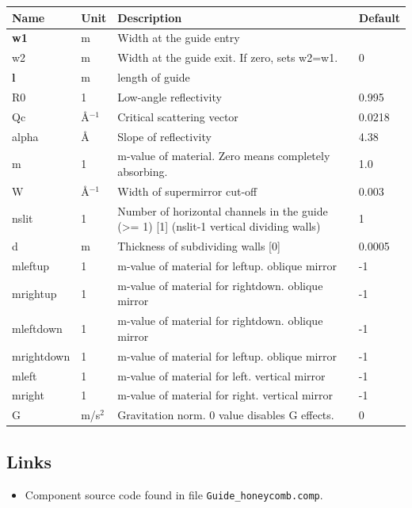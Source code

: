 \begin{longtable}{p{}p{}p{}p{}}
\toprule
\textbf{Name} & \textbf{Unit} & \textbf{Description} & \textbf{Default} \\
\midrule
\endhead
\textbf{w1} & m & Width at the guide entry &  \\
w2 & m & Width at the guide exit. If zero, sets w2=w1. & 0 \\
\textbf{l} & m & length of guide &  \\
R0 & 1 & Low-angle reflectivity & 0.995 \\
Qc & \AA{}$^{-1}$ & Critical scattering vector & 0.0218 \\
alpha & \AA{} & Slope of reflectivity & 4.38 \\
m & 1 & m-value of material. Zero means completely absorbing. & 1.0 \\
W & \AA{}$^{-1}$ & Width of supermirror cut-off & 0.003 \\
nslit & 1 & Number of horizontal channels in the guide (\textgreater{}= 1) [1] (nslit-1 vertical dividing walls) & 1 \\
d & m & Thickness of subdividing walls [0] & 0.0005 \\
mleftup & 1 & m-value of material for leftup.    oblique mirror & -1 \\
mrightup & 1 & m-value of material for rightdown. oblique mirror & -1 \\
mleftdown & 1 & m-value of material for rightdown. oblique mirror & -1 \\
mrightdown & 1 & m-value of material for leftup.    oblique mirror & -1 \\
mleft & 1 & m-value of material for left.      vertical mirror & -1 \\
mright & 1 & m-value of material for right.     vertical mirror & -1 \\
G & m/s$^{2}$ & Gravitation norm. 0 value disables G effects. & 0 \\
\bottomrule
\end{longtable}

\subsection*{Links}
\begin{itemize}
  \item Component source code found in file \texttt{Guide\_honeycomb.comp}.
\end{itemize}
